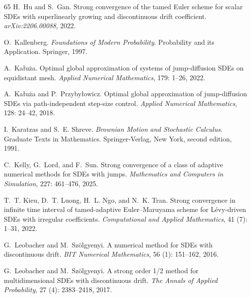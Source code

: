 \documentclass[11pt,a4paper]{article}
\numberwithin{equation}{section}
\theoremstyle{definition}
\begin{document}
{\begin{thebibliography}{65}
H.~Hu and S.~Gan.
\newblock Strong convergence of the tamed {E}uler scheme for scalar {SDE}s with superlinearly growing and discontinuous drift coefficient.
\newblock \emph{arXiv:2206.00088}, 2022.

O.~Kallenberg.
\newblock \emph{Foundations of {M}odern {P}robability}.
\newblock Probability and its Application. Springer, 1997.

A.~Ka{\l}u{\.z}a.
\newblock Optimal global approximation of systems of jump-diffusion {SDE}s on equidistant mesh.
\newblock \emph{Applied Numerical Mathematics}, 179: 1--26, 2022.

A.~Ka{\l}u{\.z}a and P.~Przyby{\l}owicz.
\newblock Optimal global approximation of jump-diffusion {SDE}s via path-independent step-size control.
\newblock \emph{Applied Numerical Mathematics}, 128: 24--42, 2018.

I.~Karatzas and S.~E. Shreve.
\newblock \emph{{B}rownian Motion and Stochastic Calculus}.
\newblock Graduate Texts in Mathematics. Springer-Verlag, New York, second edition, 1991.

C.~Kelly, G.~Lord, and F.~Sun.
\newblock Strong convergence of a class of adaptive numerical methods for {SDE}s with jumps.
\newblock \emph{Mathematics and Computers in Simulation}, 227: 461--476, 2025.

T.~T. Kieu, D.~T. Luong, H.~L. Ngo, and N.~K. Tran.
\newblock Strong convergence in infinite time interval of tamed-adaptive {E}uler--{M}aruyama scheme for {L}{\'e}vy-driven {SDE}s with irregular coefficients.
\newblock \emph{Computational and Applied Mathematics}, 41 (7): 1--31, 2022.

G.~Leobacher and M.~Sz\"olgyenyi.
\newblock A numerical method for {SDE}s with discontinuous drift.
\newblock \emph{BIT Numerical Mathematics}, 56 (1): 151--162, 2016.

G.~Leobacher and M.~Sz\"olgyenyi.
\newblock A strong order 1/2 method for multidimensional {SDE}s with discontinuous drift.
\newblock \emph{The Annals of Applied Probability}, 27 (4): 2383--2418, 2017{}.


\end{thebibliography}}
\end{document}

